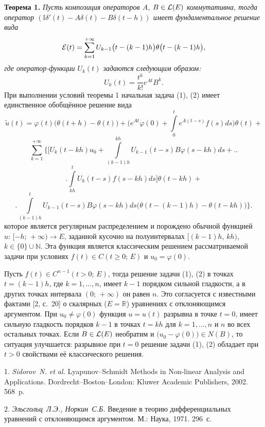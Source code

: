 \textbf{Теорема 1.} {\it Пусть композиция операторов $A$, $B\in{\cal L}(E)$ коммутативна, тогда оператор $\left({\mathbb I}\delta'(t)-A\delta(t)-B\delta(t-h)\right)$ имеет фундаментальное решение вида
$$
{\cal E}(t)=\sum\limits_{k=1}^{+\infty}U_{k-1}\bigl(t-(k-1)h\bigr)\theta\bigl(t-(k-1)h\bigr),
$$
где оператор-функции $U_{k}(t)$ задаются следующим образом:
$$
U_{k}(t)=\frac{t^{k}}{k!}e^{At}B^{k}.
$$}
При выполнении условий теоремы 1 начальная задача (1), (2) имеет единственное обобщённое решение вида
$$
\tilde{u}(t)=\varphi(t)\bigl(\theta(t+h)-\theta(t)\bigr)+\bigl(e^{At}\varphi(0)+\int\limits_{0}^{t}e^{A(t-s)}f(s)ds\bigr)\theta(t)+
$$
$$
\sum\limits_{k=1}^{+\infty}\biggl\lbrace\biggl[ U_{k}(t-kh)u_{0}+\int\limits_{(k-1)h}^{kh}U_{k-1}(t-s)B\varphi(s-kh)ds+\biggr.\biggr.
$$
$$
\biggl.\int\limits_{kh}^{t}U_{k}(t-s)f(s-kh)ds\biggr]\theta(t-kh)+
$$
$$
\biggl.\int\limits_{(k-1)h}^{t}U_{k-1}(t-s)B\varphi(s-kh)ds\bigl(\theta(t-(k-1)h)-\theta(t-kh)\bigr)\biggr\rbrace.
$$
которое является регулярным распределением и порождено обычной функцией $u:\,[-h;\,+\infty)\to E$, заданной кусочно на полуинтервалах $[(k-1)h,\,kh)$, $k\in\lbrace0\rbrace\cup{\mathbb N}$. Эта функция является классическим решением рассматриваемой задачи при условиях $f(t)\in C(t\geqslant0;\,E)$ и $u_{0}=\varphi(0)$.

Пусть $f(t)\in C^{n-1}(t>0;\,E)$, тогда решение задачи (1), (2) в точках $t=(k-1)h$, где $k=1,\ldots,n$, имеет $k-1$ порядком сильной гладкости, а в других точках интервала $(0;\,+\infty)$ он равен $n$. Это согласуется с известными фактами  [2, с.~20] о скалярных ($E={\mathbb R}$) уравнениях с отклоняющимся аргументом. При $u_{0}\neq\varphi(0)$ функция $u=u(t)$ разрывна в точке $t=0$, имеет сильную гладкость порядков $k-1$ в точках $t=kh$ для $k=1,\ldots,n$ и $n$ во всех остальных точках. Если $B\in{\cal L}(E)$ необратим и $\bigl(u_{0}-\varphi(0)\bigr)\in N(B)$, то ситуация улучшается: разрывное при $t=0$ решение задачи (1), (2) обладает при $t>0$  свойствами её классического решения.

\litlist

1. {\it Sidorov~N. et al.} Lyapunov--Schmidt Methods in Non-linear Analysis and Applications. Dordrecht--Boston--London: Kluwer Academic Publishers, 2002. 568~p.

2. {\it Эльсгольц~Л.Э., Норкин~С.Б.} Введение в теорию дифференциальных уравнений с отклоняющимся аргументом. М.: Наука, 1971. 296~с.
